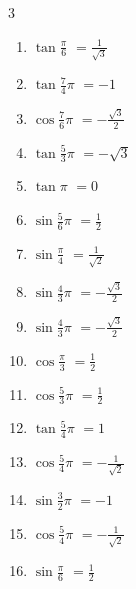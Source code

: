\begin{multicols}{3}
\begin{enumerate}
  \item $\displaystyle \tan{\frac{\pi}{6}}$
        $\displaystyle =\frac{1}{\sqrt{3}}$

  \item $\displaystyle \tan{\frac{7}{4}\pi}$
        $\displaystyle =-1$

  \item $\displaystyle \cos{\frac{7}{6}\pi}$
        $\displaystyle =-\frac{\sqrt{3}}{2}$

  \item $\displaystyle \tan{\frac{5}{3}\pi}$
        $\displaystyle =-\sqrt{3}$

  \item $\displaystyle \tan{\pi}$
        $\displaystyle =0$

  \item $\displaystyle \sin{\frac{5}{6}\pi}$
        $\displaystyle =\frac{1}{2}$

  \item $\displaystyle \sin{\frac{\pi}{4}}$
        $\displaystyle =\frac{1}{\sqrt{2}}$

  \item $\displaystyle \sin{\frac{4}{3}\pi}$
        $\displaystyle =-\frac{\sqrt{3}}{2}$

  \item $\displaystyle \sin{\frac{4}{3}\pi}$
        $\displaystyle =-\frac{\sqrt{3}}{2}$

  \item $\displaystyle \cos{\frac{\pi}{3}}$
        $\displaystyle =\frac{1}{2}$

  \item $\displaystyle \cos{\frac{5}{3}\pi}$
        $\displaystyle =\frac{1}{2}$

  \item $\displaystyle \tan{\frac{5}{4}\pi}$
        $\displaystyle =1$

  \item $\displaystyle \cos{\frac{5}{4}\pi}$
        $\displaystyle =-\frac{1}{\sqrt{2}}$

  \item $\displaystyle \sin{\frac{3}{2}\pi}$
        $\displaystyle =-1$

  \item $\displaystyle \cos{\frac{5}{4}\pi}$
        $\displaystyle =-\frac{1}{\sqrt{2}}$

  \item $\displaystyle \sin{\frac{\pi}{6}}$
        $\displaystyle =\frac{1}{2}$


\end{enumerate}
\end{multicols}
